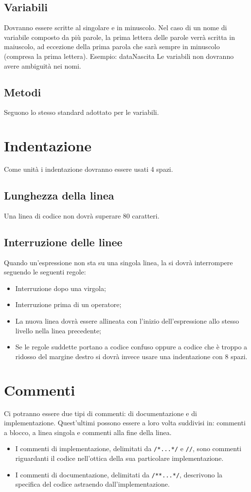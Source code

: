 \documentclass[11pt,titlepage,a4paper]{report}
\begin{document}
\subsection{Variabili}
Dovranno essere scritte al singolare e in minuscolo. Nel caso di un nome di variabile composto da pi\`u parole, la prima lettera delle parole verr\`a scritta in maiuscolo, ad eccezione della prima parola che sar\`a sempre in minuscolo (compresa la prima lettera). \newline
Esempio: dataNascita \newline
Le variabili non dovranno avere ambiguit\`a nei nomi.
\subsection{Metodi}
Seguono lo stesso standard adottato per le variabili.

\section{Indentazione}
Come unit\`a i indentazione dovranno essere usati 4 spazi.
\subsection{Lunghezza della linea}
Una linea di codice non dovr\`a superare 80 caratteri.
\subsection{Interruzione delle linee}
Quando un'espressione non sta su una singola linea, la si dovr\`a interrompere seguendo le seguenti regole:
\begin{itemize}
\item Interruzione dopo una virgola;
\item Interruzione prima di un operatore;
\item La nuova linea dovr\`a essere allineata con l'inizio dell'espressione allo stesso livello nella linea precedente;
\item Se le regole suddette portano a codice confuso oppure a codice che è troppo a ridosso del margine destro si dovr\`a invece usare una indentazione con 8 spazi.
\end{itemize}


\section{Commenti}
Ci potranno essere due tipi di commenti: di documentazione e di implementazione. Quest'ultimi possono essere a loro volta suddivisi in: commenti a blocco, a linea singola e commenti alla fine della linea.
\begin{itemize}
\item I commenti di implementazione, delimitati da \texttt{/*...*/} e \texttt{//}, sono commenti riguardanti il codice nell'ottica della sua particolare implementazione.
\item I commenti di documentazione, delimitati da \texttt{/**...*/}, descrivono la specifica del codice astraendo dall'implementazione.
\end{itemize}
\end{document}
